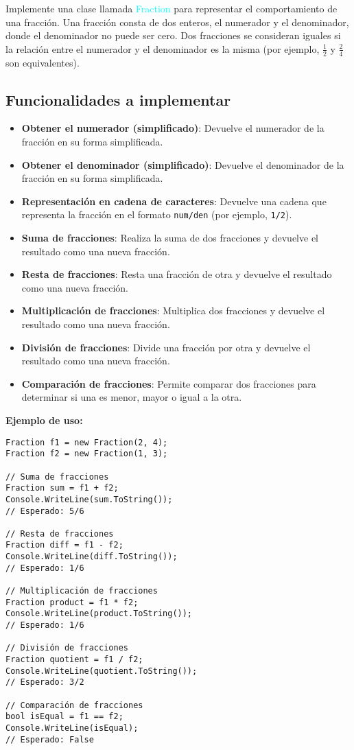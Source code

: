 Implemente una clase llamada \textcolor{cyan}{Fraction} para representar el comportamiento de una fracción. Una fracción consta de dos enteros, el numerador y el denominador, donde el denominador no puede ser cero. Dos fracciones se consideran iguales si la relación entre el numerador y el denominador es la misma (por ejemplo, $\frac{1}{2}$ y $\frac{2}{4}$ son equivalentes).

\subsection*{Funcionalidades a implementar}
\begin{itemize}
    \item \textbf{Obtener el numerador (simplificado)}: Devuelve el numerador de la fracción en su forma simplificada.
    \item \textbf{Obtener el denominador (simplificado)}: Devuelve el denominador de la fracción en su forma simplificada.
    \item \textbf{Representación en cadena de caracteres}: Devuelve una cadena que representa la fracción en el formato \texttt{num/den} (por ejemplo, \texttt{1/2}).
    \item \textbf{Suma de fracciones}: Realiza la suma de dos fracciones y devuelve el resultado como una nueva fracción.
    \item \textbf{Resta de fracciones}: Resta una fracción de otra y devuelve el resultado como una nueva fracción.
    \item \textbf{Multiplicación de fracciones}: Multiplica dos fracciones y devuelve el resultado como una nueva fracción.
    \item \textbf{División de fracciones}: Divide una fracción por otra y devuelve el resultado como una nueva fracción.
    \item \textbf{Comparación de fracciones}: Permite comparar dos fracciones para determinar si una es menor, mayor o igual a la otra.
\end{itemize}

\textbf{Ejemplo de uso:}
\begin{lstlisting}
Fraction f1 = new Fraction(2, 4);
Fraction f2 = new Fraction(1, 3);

// Suma de fracciones
Fraction sum = f1 + f2;
Console.WriteLine(sum.ToString());
// Esperado: 5/6

// Resta de fracciones
Fraction diff = f1 - f2;
Console.WriteLine(diff.ToString());
// Esperado: 1/6

// Multiplicación de fracciones
Fraction product = f1 * f2;
Console.WriteLine(product.ToString());
// Esperado: 1/6

// División de fracciones
Fraction quotient = f1 / f2;
Console.WriteLine(quotient.ToString());
// Esperado: 3/2

// Comparación de fracciones
bool isEqual = f1 == f2;
Console.WriteLine(isEqual);
// Esperado: False
\end{lstlisting}